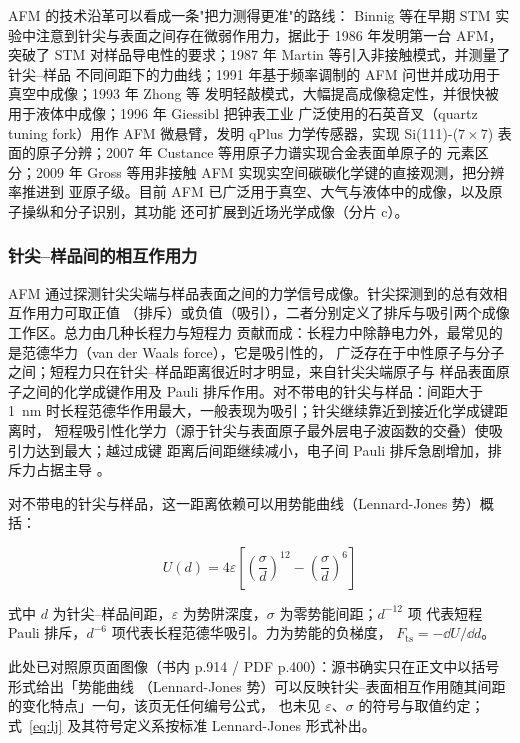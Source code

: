 AFM 的技术沿革可以看成一条"把力测得更准"的路线：
Binnig 等在早期 STM 实验中注意到针尖与表面之间存在微弱作用力，据此于 1986 年发明第一台
AFM，突破了 STM 对样品导电性的要求；1987 年 Martin 等引入非接触模式，并测量了针尖--样品
不同间距下的力曲线；1991 年基于频率调制的 AFM 问世并成功用于真空中成像；1993 年 Zhong 等
发明轻敲模式，大幅提高成像稳定性，并很快被用于液体中成像；1996 年 Giessibl 把钟表工业
广泛使用的石英音叉（quartz tuning fork）用作 AFM 微悬臂，发明 qPlus 力学传感器，实现
Si(111)-($7\times7$) 表面的原子分辨；2007 年 Custance 等用原子力谱实现合金表面单原子的
元素区分；2009 年 Gross 等用非接触 AFM 实现实空间碳碳化学键的直接观测，把分辨率推进到
亚原子级。目前 AFM 已广泛用于真空、大气与液体中的成像，以及原子操纵和分子识别，其功能
还可扩展到近场光学成像（分片 c）。

\subsubsection{针尖--样品间的相互作用力}

\begin{principle}
AFM 通过探测针尖尖端与样品表面之间的力学信号成像。针尖探测到的总有效相互作用力可取正值
（排斥）或负值（吸引），二者分别定义了排斥与吸引两个成像工作区。总力由几种长程力与短程力
贡献而成：长程力中除静电力外，最常见的是范德华力（van der Waals force），它是吸引性的，
广泛存在于中性原子与分子之间；短程力只在针尖--样品距离很近时才明显，来自针尖尖端原子与
样品表面原子之间的化学成键作用及 Pauli 排斥作用。对不带电的针尖与样品：间距大于
\qty{1}{nm} 时长程范德华作用最大，一般表现为吸引；针尖继续靠近到接近化学成键距离时，
短程吸引性化学力（源于针尖与表面原子最外层电子波函数的交叠）使吸引力达到最大；越过成键
距离后间距继续减小，电子间 Pauli 排斥急剧增加，排斥力占据主导
。
\end{principle}

对不带电的针尖与样品，这一距离依赖可以用势能曲线（Lennard-Jones 势）概括：

\begin{equation}\label{eq:lj}
U(d)=4\varepsilon\left[\left(\frac{\sigma}{d}\right)^{12}-\left(\frac{\sigma}{d}\right)^{6}\right]
\end{equation}

式中 $d$ 为针尖--样品间距，$\varepsilon$ 为势阱深度，$\sigma$ 为零势能间距；$d^{-12}$ 项
代表短程 Pauli 排斥，$d^{-6}$ 项代表长程范德华吸引。力为势能的负梯度，
$F_{\mathrm{ts}}=-\dd U/\dd d$。

此处已对照原页面图像（书内 p.914 / PDF p.400）：源书确实只在正文中以括号形式给出「势能曲线
（Lennard-Jones 势）可以反映针尖--表面相互作用随其间距的变化特点」一句，该页无任何编号公式，
也未见 $\varepsilon$、$\sigma$ 的符号与取值约定；式~\eqref{eq:lj} 及其符号定义系按标准
Lennard-Jones 形式补出。

